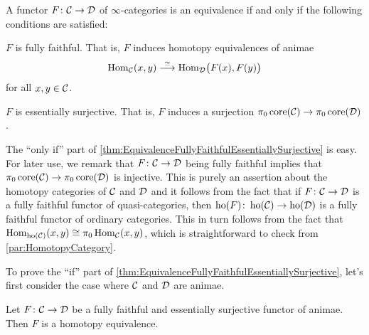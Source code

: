 \begin{thm}\label{thm:EquivalenceFullyFaithfulEssentiallySurjective}
	A functor $F\colon \mathcal{C}\rightarrow \mathcal{D}$ of $\infty$-categories is an equivalence if and only if the following conditions are satisfied:
	\begin{alphanumerate}
		\item $F$ is fully faithful. That is, $F$ induces homotopy equivalences of animae
		\begin{equation*}
			\Hom_\Cc\!\left(x,y\right)\overset{\simeq}{\longrightarrow}\Hom_\Dd\lef(F(x),F(y)\righ)
		\end{equation*}
		for all $x,y\in\mathcal{C}$.
		\item $F$ is essentially surjective. That is, $F$ induces a surjection $\pi_0\operatorname{core} (\mathcal{C})\rightarrow\pi_0\operatorname{core}(\mathcal{D})$.
	\end{alphanumerate}
\end{thm}
\begin{rem}\label{rem:FullyFaithfulImpliesInjectiveOnPi0Core}
	The \enquote{only if} part of \cref{thm:EquivalenceFullyFaithfulEssentiallySurjective} is easy. For later use, we remark that $F\colon \mathcal{C}\rightarrow\mathcal{D}$ being fully faithful implies that $\pi_0\operatorname{core}(\mathcal{C})\rightarrow\pi_0\operatorname{core}(\mathcal{D})$ is injective. %
	This is purely an assertion about the homotopy categories of $\mathcal{C}$ and $\mathcal{D}$ and it follows from the fact that if $F\colon \mathcal{C}\rightarrow\mathcal{D}$ is a fully faithful functor of quasi-categories, then $\operatorname{ho}(F)\colon \operatorname{ho}(\mathcal{C})\rightarrow \operatorname{ho}(\mathcal{D})$ is a fully faithful functor of ordinary categories. This in turn follows from the fact that $\operatorname{Hom}_{\operatorname{ho}(\mathcal{C})}(x,y)\cong \pi_0\operatorname{Hom}_{\mathcal{C}}(x,y)$, which is straightforward to check from \cref{par:HomotopyCategory}.
\end{rem}
To prove the \enquote{if} part of \cref{thm:EquivalenceFullyFaithfulEssentiallySurjective}, let's first consider the case where $\mathcal{C}$ and $\mathcal{D}$ are animae.
\begin{lem}\label{lem:FullyFaithfulAnimae}
	Let $F\colon \mathcal{C}\rightarrow\mathcal{D}$ be a fully faithful and essentially surjective functor of animae. Then $F$ is a homotopy equivalence.
\end{lem}
